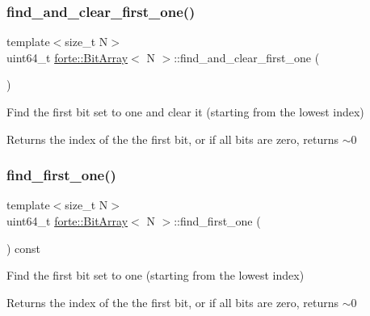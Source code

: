 \mbox{\label{classforte_1_1_bit_array_a8485474d3cf2fc4c7ddca917e044e0bc}} 
\subsubsection{\texorpdfstring{find\+\_\+and\+\_\+clear\+\_\+first\+\_\+one()}{find\_and\_clear\_first\_one()}}
{\footnotesize\ttfamily template$<$size\+\_\+t N$>$ \\
uint64\+\_\+t \mbox{\hyperlink{classforte_1_1_bit_array}{forte\+::\+Bit\+Array}}$<$ N $>$\+::find\+\_\+and\+\_\+clear\+\_\+first\+\_\+one (\begin{DoxyParamCaption}{ }\end{DoxyParamCaption})\hspace{0.3cm}{\ttfamily [inline]}}

Find the first bit set to one and clear it (starting from the lowest index) \begin{DoxyReturn}{Returns}
the index of the the first bit, or if all bits are zero, returns $\sim$0 
\end{DoxyReturn}
\mbox{\label{classforte_1_1_bit_array_a8097da916dcef4238671782f4b6e3e59}} 
\subsubsection{\texorpdfstring{find\+\_\+first\+\_\+one()}{find\_first\_one()}}
{\footnotesize\ttfamily template$<$size\+\_\+t N$>$ \\
uint64\+\_\+t \mbox{\hyperlink{classforte_1_1_bit_array}{forte\+::\+Bit\+Array}}$<$ N $>$\+::find\+\_\+first\+\_\+one (\begin{DoxyParamCaption}{ }\end{DoxyParamCaption}) const\hspace{0.3cm}{\ttfamily [inline]}}

Find the first bit set to one (starting from the lowest index) \begin{DoxyReturn}{Returns}
the index of the the first bit, or if all bits are zero, returns $\sim$0 
\end{DoxyReturn}
\mbox{\label{classforte_1_1_bit_array_ae6c9b2e2ddeaff0df89bc96f27625eb6}} 
